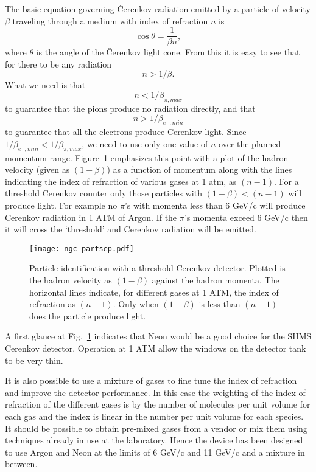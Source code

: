 {The basic equation  governing \v Cerenkov radiation emitted by a particle
of velocity $\beta$ traveling through a medium with index of refraction
$n$ is \begin{equation}\cos \theta = \frac{1}{\beta n},\end{equation}
where $\theta$ is the angle of the \v Cerenkov light cone.
From this it is easy to see that for there to be any radiation
$$n > 1/\beta.$$ What we need is that
\begin{equation} n < 1/\beta_{\pi,max}\label{eq:index} \end{equation}
to guarantee that the pions produce no radiation directly, and that
\begin{equation} n > 1/\beta_{e^-,min} \end{equation}
to guarantee that all the electrons produce Cerenkov light. Since
$1/\beta_{e^-,min} < 1/\beta_{\pi,max}$, we need to use only one value
of $n$ over the planned momentum range. Figure~\ref{fig:partsep}
emphasizes this point with a plot of the hadron velocity (given as
$(1-\beta)$) as a function of momentum along with the lines indicating
the index of refraction of various gases at 1 atm, as $(n-1)$.  For a
threshold Cerenkov counter only those particles with $(1-\beta) <
(n-1)$ will produce light. For example no $\pi$'s with momenta less
than 6 GeV/c will produce Cerenkov radiation in 1 ATM of Argon. If the
$\pi$'s momenta exceed 6 GeV/c then it will cross the `threshold' and
Cerenkov radiation will be emitted.
 \begin{figure}[!h] %
   \centering
   \texttt{[image: ngc-partsep.pdf]}
   \caption{Particle identification with a threshold Cerenkov
     detector. Plotted is the hadron velocity as $(1-\beta)$ against
     the hadron momenta. The horizontal lines indicate, for different
     gases at 1 ATM, the index of refraction as $(n-1)$. Only when
     $(1-\beta)$ is less than $(n-1)$ does the particle produce
     light.}
   \label{fig:partsep}
\end{figure}
A first glance at Fig.~\ref{fig:partsep} indicates that Neon would be
a good choice for the SHMS Cerenkov detector. Operation at 1 ATM allow
the windows on the detector tank to be very thin.

It is also possible to use a mixture of gases to fine tune the index
of refraction and improve the detector performance. In this case the
weighting of the index of refraction of the different gases is by the
number of molecules per unit volume for each gas and the index is
linear in the number per unit volume for each species. It should be
possible to obtain pre-mixed gases from a vendor or mix them using
techniques already in use at the laboratory. Hence the device has been
designed to use Argon and Neon at the limits of 6 GeV/c and 11 GeV/c
and a mixture in between.


}
